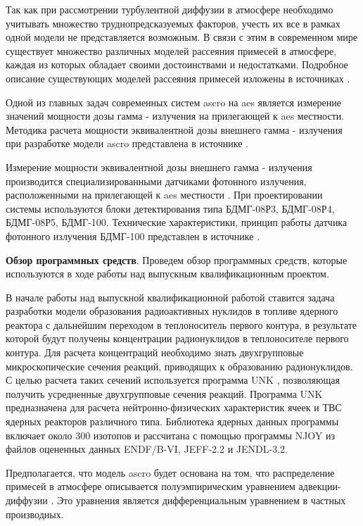 Так как при рассмотрении турбулентной диффузии в атмосфере необходимо учитывать множество труднопредсказуемых факторов, 
учесть их все в рамках одной модели не представляется возможным. В связи с этим в современном мире существует множество 
различных моделей рассеяния примесей в атмосфере, каждая из которых обладает своими достоинствами и недостатками. 
Подробное описание существующих моделей рассеяния примесей изложены в источниках \cite{setton, bizova_meteor, berlyand, 
radio_transfer, disper_atmos, met_radio, general_exposure, laihtman, bizova_scatter, disper_models}.

Одной из главных задач современных систем \ac{ascro} на \ac{aes} является измерение значений мощности дозы 
гамма - излучения на прилегающей к \ac{aes} местности. Методика расчета мощности эквивалентной дозы внешнего гамма - 
излучения при разработке модели \ac{ascro} представлена в источнике \cite{elokhin}. 

Измерение мощности эквивалентной дозы внешнего гамма - излучения производится специализированными датчиками фотонного 
излучения, расположенными на прилегающей к \ac{aes} местности \cite{elokhin}. При проектировании системы используются 
блоки детектирования типа БДМГ-08Р3, БДМГ-08Р4, БДМГ-08Р5, БДМГ-100. Технические характеристики, принцип работы датчика 
фотонного излучения БДМГ-100 представлен в источнике \cite{bdmg-100}.

\textbf{Обзор программных средств}. Проведем обзор программных средств, которые используются в ходе работы над выпускным 
квалификационным проектом. 

В начале работы над выпускной квалификационной работой ставится задача разработки модели образования радиоактивных 
нуклидов в топливе ядерного реактора с дальнейшим переходом в теплоноситель первого контура, в результате которой будут 
получены концентрации радионуклидов в теплоносителе первого контура. Для расчета концентраций необходимо знать двухгрупповые 
микроскопические сечения реакций, приводящих к образованию радионуклидов. С целью расчета таких сечений используется 
программа UNK \cite{unk}, позволяющая получить усредненные двухгрупповые сечения реакций. Программа UNK предназначена 
для расчета нейтронно-физических характеристик ячеек и ТВС ядерных реакторов различного типа. Библиотека ядерных данных 
программы включает около 300 изотопов и рассчитана с помощью программы NJOY из файлов оцененных данных ENDF/B-VI, 
JEFF-2.2 и JENDL-3.2.

Предполагается, что модель \ac{ascro} будет основана на том, что распределение примесей в атмосфере описывается 
полуэмпирическим уравнением адвекции-диффузии \cite{elokhin}. Это уравнения является дифференциальным уравнением в 
частных производных. 

